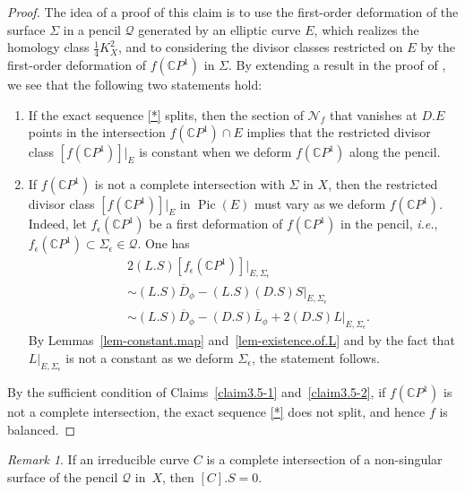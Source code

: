 \documentclass[10pt,a4paper]{article}
\numberwithin{equation}{section}
\theoremstyle{definition}
\theoremstyle{plain}
\theoremstyle{remark}
\newtheorem{remark}[definition]{Remark}
\newcommand{\C}{\mathbb{C}}
\DeclareMathOperator{\Pic}{Pic}
\begin{document}
\begin{proof}
The idea of a proof of this claim is to use the first-order deformation of the surface $\Sigma$ in a pencil $\mathcal{Q}$ generated by an elliptic curve $E$, which realizes the homology class $\frac{1}{4}K^2_X$, and to considering the divisor classes restricted on $E$ by the first-order deformation of $f(\mathbb{C}P^1)$ in $\Sigma$.  By extending a result in the proof of \cite[Theorem~(4.f.3)]{griffiths1983infinitesimal}, we see that the following two statements hold: 
\begin{enumerate}
\item If the exact sequence \eqref{*} splits, then the section of $\mathcal{N}_f$ that vanishes at $D.E$ points in the intersection $f(\C P^1)\cap E$ implies that the restricted divisor class  $[f(\mathbb{C}P^1)]|_E$ is constant when we deform $f(\C P^1)$ along the pencil. 
\item If $f(\C P^1)$ is not a complete intersection with $\Sigma$ in $X$, then the restricted divisor class $[f(\mathbb{C}P^1)]|_E$ in $\Pic(E)$ must vary as we deform $f(\C P^1)$. Indeed, let $f_\epsilon(\C P^1)$ be a first deformation of $f(\C P^1)$ in the pencil, \textit{i.e.}, $f_\epsilon(\C P^1)\subset \Sigma_\epsilon\in \mathcal{Q}$. One has
\begin{equation*}
\begin{aligned}
      &2(L.S)\left[f_\epsilon(\C P^1)\right]|_{E,\Sigma_\epsilon}\\
    &\sim (L.S) \overline{D}_{\phi}- (L.S)(D.S)S|_{E,\Sigma_\epsilon}\\
    &\sim (L.S)\overline{D}_{\phi}-(D.S)\overline{L}_{\phi}+ 2(D.S)L|_{E,\Sigma_\epsilon}.
\end{aligned}
\end{equation*}
  By Lemmas~\ref{lem-constant.map} and~\ref{lem-existence.of.L} and by the fact that $L|_{E,\Sigma_\epsilon}$ is not a constant as we deform $\Sigma_\epsilon$, the statement follows.
\end{enumerate} 


By the sufficient condition of Claims~\ref{claim3.5-1} and~\ref{claim3.5-2}, if $f(\C P^1)$ is not a complete intersection, the exact sequence \eqref{*} does not split, and hence $f$ is balanced.
 \end{proof}

\begin{remark}
       If an irreducible curve $C$ is a complete intersection of a non-singular surface of the  pencil $\mathcal{Q}$ in~$X$, then $[C].S=0$.
    \end{remark}
\end{document}

